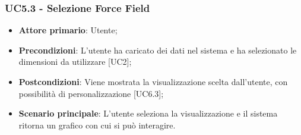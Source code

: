 \subsubsection{UC5.3 - Selezione Force Field}
\begin{itemize}
	\item \textbf{Attore primario}: Utente;
	\item \textbf{Precondizioni}: L'utente ha caricato dei dati nel sistema e ha selezionato le dimensioni da utilizzare [UC2];
	\item \textbf{Postcondizioni}: Viene mostrata la visualizzazione  scelta dall'utente, con possibilità di personalizzazione [UC6.3];
	\item \textbf{Scenario principale}: L'utente seleziona la visualizzazione  e il sistema ritorna un grafico con cui si può interagire.
\end{itemize}